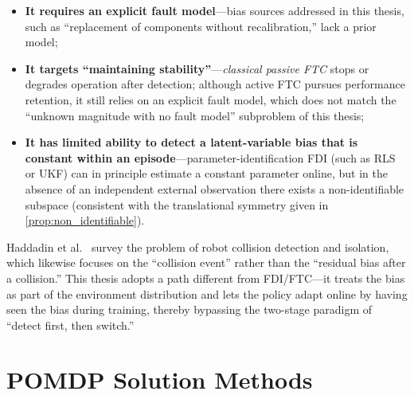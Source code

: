 \begin{itemize}
  \item \textbf{It requires an explicit fault model}---bias sources addressed in this thesis, such as ``replacement of components without recalibration,'' lack a prior model;
  \item \textbf{It targets ``maintaining stability''}---\emph{classical passive FTC} stops or degrades operation after detection; although active FTC pursues performance retention, it still relies on an explicit fault model, which does not match the ``unknown magnitude with no fault model'' subproblem of this thesis;
  \item \textbf{It has limited ability to detect a latent-variable bias that is constant within an episode}---parameter-identification FDI (such as RLS or UKF) can in principle estimate a constant parameter online, but in the absence of an independent external observation there exists a non-identifiable subspace (consistent with the translational symmetry given in \cref{prop:non_identifiable}).
\end{itemize}

\noindent Haddadin et al.~\cite{haddadin2017robot} survey the problem of robot collision detection and isolation, which likewise focuses on the ``collision event'' rather than the ``residual bias after a collision.'' This thesis adopts a path different from FDI/FTC---it treats the bias as part of the environment distribution and lets the policy adapt online by having seen the bias during training, thereby bypassing the two-stage paradigm of ``detect first, then switch.''

\section{POMDP Solution Methods}\label{sec:pomdp_methods}

